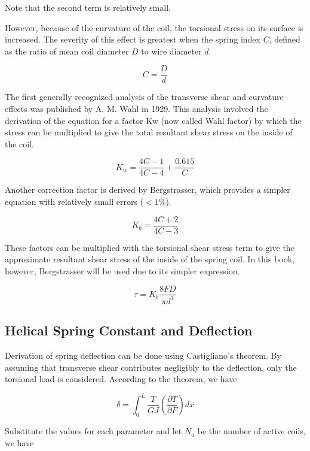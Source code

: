 \documentclass[
10pt,
a4paper,
openany,
svgnames,
]{book}
\begin{document}
Note that the second term is relatively small.

However, because of the curvature of the coil, the torsional stress on its surface is increased. The severity of this effect is greatest when the spring index $C$, defined as the ratio of mean coil diameter $D$ to wire diameter $d$.

\begin{equation}
  C = \frac{D}{d}
\end{equation}

The first generally recognized analysis of the transverse shear and curvature effects was published by A. M. Wahl in 1929. This analysis involved the derivation of the equation for a factor Kw (now called Wahl factor) by which the stress can be multiplied to give the total resultant shear stress on the inside of the coil.

\[K_w = \frac{4C - 1}{4C - 4} + \frac{0.615}{C}\]

Another correction factor is derived by Bergstrasser, which provides a simpler equation with relatively small errors ($< 1\%$).

\begin{equation}
  K_b = \frac{4C + 2}{4C - 3}
\end{equation}

These factors can be multiplied with the torsional shear stress term to give the approximate resultant shear stress of the inside of the spring coil. In this book, however, Bergstrasser will be used due to its simpler expression.

\begin{equation} \label{eqn: spring torsional stress}
  \tau  = K_b\frac{8FD}{\pi d^3}
\end{equation}

\subsection{Helical Spring Constant and Deflection}

Derivation of spring deflection can be done using Castigliano’s theorem. By assuming that transverse shear contributes negligibly to the deflection, only the torsional load is considered. According to the theorem, we have

\[\delta  = \int_0^L \frac{T}{GJ}\left( \frac{\partial T}{\partial F} \right)dx\]

Substitute the values for each parameter and let $N_a$ be the number of active coils, we have
\end{document}
